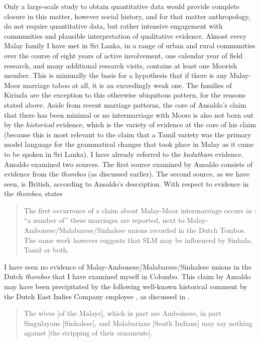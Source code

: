 Only a large-scale study to obtain quantitative data would provide complete closure in this matter, however social history, and for that matter anthropology, do not require quantitative data, but rather intensive engagement with communities and plausible interpretation of qualitative evidence. Almost every Malay family I have met in Sri Lanka, in a range of urban and rural communities over the course of eight years of active involvement, one calendar year of field research, and many additional research visits, contains at least one Moorish member. This is minimally the basis for a hypothesis that if there is any Malay-Moor marriage taboo at all, it is an exceedingly weak one. The families of Kirinda are the exception to this otherwise ubiquitous pattern, for the reasons stated above. Aside from recent marriage patterns, the core of Ansaldo's claim that there has been minimal or no intermarriage with Moors is also not born out by the \textit{historical} evidence, which is the variety of evidence at the core of his claim (because this is most relevant to the claim that a Tamil variety was the primary model language for the grammatical changes that took place in Malay as it came to be spoken in Sri Lanka).  I have already referred to the \textit{kadutham} evidence. Ansaldo examined two sources. The first source examined by Ansaldo consists of evidence from the \textit{thombos} (as discussed earlier). The second source, as we have seen, is British, according to Ansaldo's description.    With respect to evidence in the \textit{thombos}, \citet{Ansaldo2008genesis} states

\begin{quote}
  The first occurrence of a claim about Malay-Moor intermarriage occurs in \citet{Hussainmiya1987}: ``a number of'' these marriages are reported, next to Malay-Ambonese/Malabarese/Sinhalese unions recorded in the Dutch Tombos. The same work however suggests that SLM may be influenced by Sinhala, Tamil or both.
\end{quote}


I have seen no evidence of Malay-Ambonese/Malabarese/Sinhalese unions in the Dutch \textit{thombos} that I have examined myself in Colombo. This claim by Ansaldo may have been precipitated by the following well-known historical comment by the Dutch East Indies Company employee \citet{Schweitzer1680}, as discussed in \citet{Nordhoff2009}.

\begin{quote}
 The wives [of the Malays], which in part are Amboinese, in part Singulayans [Sinhalese], 
 and Malabarians [South Indians] may say nothing against [the stripping of their ornaments].
\end{quote}


